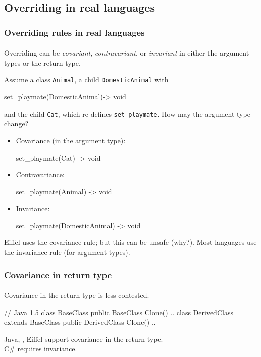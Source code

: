 \documentclass{beamer}
\begin{document}
\subsection{Overriding in real languages}

\begin{frame}[fragile]
\frametitle{Overriding rules in real languages}
\framesubtitle{}
Overriding can be \textit{covariant}, 
\textit{contravariant}, or \textit{invariant} in either
the argument types or the return type.
\bigskip


Assume a class \texttt{Animal}, a child \texttt{DomesticAnimal} with 
\begin{cplus3}
       set_playmate(DomesticAnimal)->  void 
\end{cplus3}

and the child \texttt{Cat},
which re-defines \texttt{set_playmate}. 
How may the argument type change?%
\begin{itemize}
\item Covariance (in the argument type):
\begin{cplus3}
 set_playmate(Cat) -> void
\end{cplus3}
 \item Contravariance:
\begin{cplus3}
 set_playmate(Animal) -> void
\end{cplus3}
  \item Invariance: 
\begin{cplus3}
 set_playmate(DomesticAnimal) -> void
\end{cplus3}


\end{itemize}
Eiffel uses the covariance rule; but this can be unsafe (why?).
Most languages use the invariance rule (for argument types). 
\end{frame}

\begin{frame}[fragile]
\frametitle{Covariance in return type}
\framesubtitle{}
Covariance in the return type is less contested.
\bigskip

\begin{cplus3}
// Java 1.5
class BaseClass {
    public BaseClass Clone() {..}
}
class DerivedClass extends BaseClass {
    public DerivedClass Clone() {..}
}
\end{cplus3}
Java, \Cpp, Eiffel support covariance in the return type.\\
C\# requires invariance. 
\end{frame}
\end{document}
